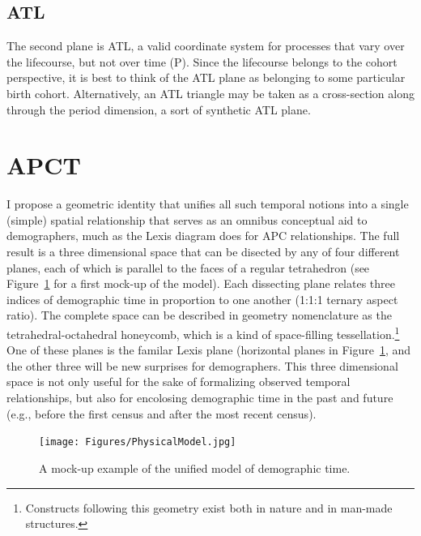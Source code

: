 \documentclass[11pt,oneside]{article} %
\begin{document}
\subsection*{ATL}
The second plane is ATL, a valid coordinate system for
processes that vary over the lifecourse, but not over time (P). Since the
lifecourse belongs to the cohort perspective, it is best to think of the ATL
plane as belonging to some particular birth cohort. Alternatively, an ATL
triangle may be taken as a cross-section along through the period dimension, a
sort of synthetic ATL plane.



\section*{APCT}
I propose a geometric
identity that unifies all such temporal notions into a single (simple) spatial
relationship that serves as an omnibus conceptual aid to demographers, much as
the Lexis diagram does for APC relationships. The full result is a three
dimensional space that can be disected by any of four different planes,
each of which is parallel to the faces of a regular tetrahedron (see
Figure~\ref{fig:APCT} for a first mock-up of the model).
Each dissecting plane relates three indices of demographic time in proportion to one
another (1:1:1 ternary aspect ratio). The complete space can be described in
geometry nomenclature as the tetrahedral-octahedral honeycomb, which is a kind of space-filling tessellation.\footnote{Constructs following
this geometry exist both in nature and in man-made structures.} 
One of these planes is the familar Lexis plane (horizontal planes in
Figure~\ref{fig:APCT}, and the other three will be new surprises for
demographers. This three dimensional space is not only useful for the sake of formalizing observed temporal relationships, but also for encolosing
demographic time in the past and future (e.g., before the first census and after
the most recent census). 

\begin{figure}[!h]
\centering
\caption[cap]{A mock-up example of the unified model of demographic
time.\footnotemark}
\label{fig:APCT}
	\texttt{[image: Figures/PhysicalModel.jpg]}
\end{figure}
\end{document}

